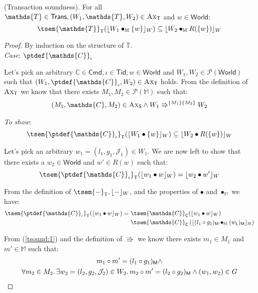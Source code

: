 \thm (Transaction soundness). For all $\mathds{T} \in \mathsf{Trans}, (W_1, \mathds{T}, W_2) \in \textsc{Ax}_\mathsf{T}$ and $w \in \mathsf{World}$:
\[
	\tsem{\mathds{T}}_\mathsf{T}(\lfloor W_1 \bullet_\mathbb{M} \{ w \} \rfloor_W) \subseteq \lfloor W_2 \bullet_\mathbb{M} R(\{ w \}) \rfloor_W
\]

{\parindent0pt
\begin{proof}
By induction on the structure of $\mathds{T}$. \\	

\textit{Case}: $\ptdef{\mathds{C}}_\iota$

Let's pick an arbitrary $\mathds{C} \in \mathsf{Cmd}, \iota \in \mathsf{Tid}, w \in \mathsf{World}$ and $W_1, W_2 \in \mathcal{P}(\mathsf{World})$ such that $(W_1, \ptdef{\mathds{C}}_\iota, W_2) \in \textsc{Ax}_\mathsf{T}$ holds. From the definition of $\textsc{Ax}_\mathsf{T}$ we know that there exists $M_1, M_2 \in \mathcal{P}(\mathbb{M})$ such that:
\begin{gather}\label{tsound:1}
	(M_1, \mathds{C}, M_2) \in \textsc{Ax}_\mathsf{S} \land W_1 \Rrightarrow^{\{M_1\}\{M_2\}} W_2
\end{gather}

\textit{To show}:
\[
	\tsem{\ptdef{\mathds{C}}_\iota}_\mathsf{T}(\lfloor W_1 \bullet \{w\} \rfloor_W) \subseteq \lfloor W_2 \bullet R(\{w\}) \rfloor_W
\]

Let's pick an arbitrary $w_1 = (l_1, g_1, \mathcal{J}_1) \in W_1$. We are now left to show that there exists a $w_2 \in \mathsf{World}$ and $w' \in R(w)$ such that:
\[
	\tsem{\ptdef{\mathds{C}}_\iota}_\mathsf{T}(\lfloor w_1 \bullet w \rfloor_W) = \lfloor w_2 \bullet w' \rfloor_W
\]

From the definition of $\tsem{-}_\mathsf{T}, \lfloor - \rfloor_W$, and the properties of $\bullet$ and $\bullet_\mathbb{M}$ we have:
\begin{align}\label{tsound:2}
\tsem{\ptdef{\mathds{C}}_\iota}_\mathsf{T}(\lfloor w_1 \bullet w \rfloor_W) =\
&\tsem{\mathds{C}}_\mathsf{C}(\lfloor w_1 \bullet w \rfloor_W) \\
&\tsem{\mathds{C}}_\mathsf{C}\left( \lfloor (l_1 \circ g_1)_\mathsf{M} \bullet_\mathbb{M} (w_\mathsf{L})_\mathsf{M} \rfloor_\mathbb{M} \right)
\end{align}

From (\ref{tsound:1}) and the definition of $\Rrightarrow$ we know there exists $m_1 \in M_1$ and $m' \in \mathbb{M}$ such that:
\begin{gather}
\label{tsound:3} m_1 \circ m' = (l_1 \circ g_1)_\mathsf{M} \land \\
\label{tsound:4} \forall m_2 \in M_2 \ldotp \exists w_2 = (l_2, g_2, \mathcal{J}_2) \in W_2 \ldotp m_2 \circ m' = (l_2 \circ g_2)_\mathsf{M} \land (w_1, w_2) \in G
\end{gather}


\end{proof}}
